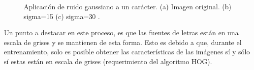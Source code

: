		\begin{figure}[htbp]
			\centering
			\caption[Ruido Gaussiano en un carácter]{Aplicación de ruido gaussiano a un carácter. (a) Imagen original. (b) sigma=15  (c) sigma=30 .}
			\label{fig: Ruido Gaussiano}
		\end{figure}
			
			Un punto a destacar en este proceso, es que las fuentes de letras están en una escala de grises y se mantienen de esta forma. Esto es debido a que, durante el entrenamiento, solo es posible obtener las características de las imágenes sí y sólo sí estas están en escala de grises (requerimiento del algoritmo HOG). 
			
			
					
			

